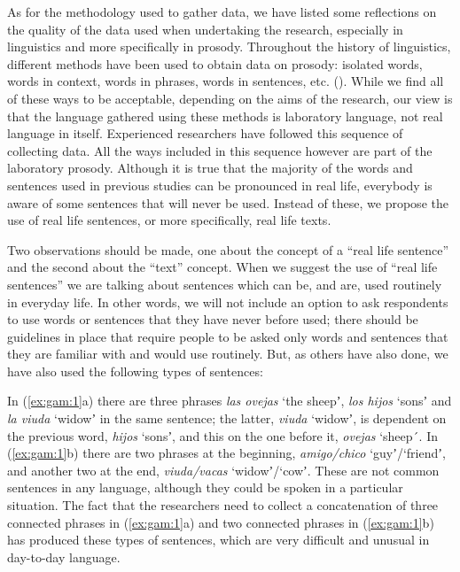 \documentclass[output=paper]{langsci/langscibook}
\begin{document}
As for the methodology used to gather data, we have listed some reflections on the quality of the data used when undertaking the research, especially in linguistics and more specifically in prosody. Throughout the history of linguistics, different methods have been used to obtain data on prosody: isolated words, words in context, words in phrases, words in sentences, etc. (\citealt{Gaminde.2015,Gaminde.2016}). While we find all of these ways to be acceptable, depending on the aims of the research, our view is that the language gathered using these methods is laboratory language, not real language in itself. Experienced researchers have followed this sequence of collecting data. All the ways included in this sequence however are part of the laboratory prosody. Although it is true that the majority of the words and sentences used in previous studies can be pronounced in real life, everybody is aware of some sentences that will never be used. Instead of these, we propose the use of real life sentences, or more specifically, real life texts.

Two observations should be made, one about the concept of a ``real life sentence” and the second about the ``text” concept. When we suggest the use of ``real life sentences” we are talking about sentences which can be, and are, used routinely in everyday life. In other words, we will not include an option to ask respondents to use words or sentences that they have never before used; there should be guidelines in place that require people to be asked only words and sentences that they are familiar with and would use routinely. But, as others have also done, we have also used the following types of sentences:


In (\ref{ex:gam:1}a) there are three phrases \textit{las ovejas} `the sheepʼ, \textit{los hijos} `sonsʼ and \textit{la viuda} `widowʼ in the same sentence; the latter, \textit{viuda} `widowʼ, is dependent on the previous word, \textit{hijos} `sonsʼ, and this on the one before it, \textit{ovejas} `sheep´. In (\ref{ex:gam:1}b) there are two phrases at the beginning, \textit{amigo/chico} `guyʼ/`friendʼ, and another two at the end, \textit{viuda/vacas} `widowʼ/`cowʼ. These are not common sentences in any language, although they could be spoken in a particular situation. The fact that the researchers need to collect a concatenation of three connected phrases in (\ref{ex:gam:1}a) and two connected phrases in (\ref{ex:gam:1}b) has produced these types of sentences, which are very difficult and unusual in day-to-day language.
\end{document}
